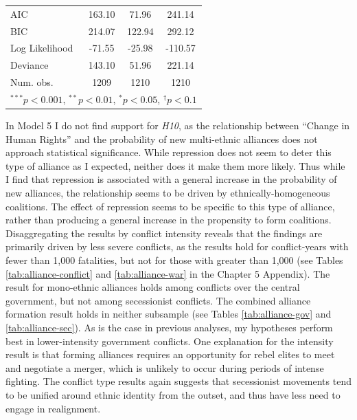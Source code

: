 \documentclass[12pt,]{book}
\let\origtable\table
\let\endorigtable\endtable
\renewenvironment{table}[1][2] {
    \singlespacing
    \expandafter\origtable\expandafter[H]
} {
    \endorigtable
}
\theoremstyle{definition}
\theoremstyle{definition}
\theoremstyle{definition}
\theoremstyle{remark}
\begin{document}
\begin{table}
\begin{center}
\begin{tabular}{l c c c }
AIC                               & 163.10            & 71.96     & 241.14            \\
BIC                               & 214.07            & 122.94    & 292.12            \\
Log Likelihood                    & -71.55            & -25.98    & -110.57           \\
Deviance                          & 143.10            & 51.96     & 221.14            \\
Num. obs.                         & 1209              & 1210      & 1210              \\
\hline
\multicolumn{4}{l}{\scriptsize{$^{***}p<0.001$, $^{**}p<0.01$, $^*p<0.05$, $^{\dagger}p<0.1$}}
\end{tabular}
\caption{Rare Events Logit Models of Alliance Formation}
\label{tab:alliance}
\end{center}
\end{table}

In Model 5 I do not find support for \emph{H10}, as the relationship
between ``Change in Human Rights'' and the probability of new
multi-ethnic alliances does not approach statistical significance. While
repression does not seem to deter this type of alliance as I expected,
neither does it make them more likely. Thus while I find that repression
is associated with a general increase in the probability of new
alliances, the relationship seems to be driven by ethnically-homogeneous
coalitions. The effect of repression seems to be specific to this type
of alliance, rather than producing a general increase in the propensity
to form coalitions. Disaggregating the results by conflict intensity
reveals that the findings are primarily driven by less severe conflicts,
as the results hold for conflict-years with fewer than 1,000 fatalities,
but not for those with greater than 1,000 (see Tables
\ref{tab:alliance-conflict} and \ref{tab:alliance-war} in the Chapter 5
Appendix). The result for mono-ethnic alliances holds among conflicts
over the central government, but not among secessionist conflicts. The
combined alliance formation result holds in neither subsample (see
Tables \ref{tab:alliance-gov} and \ref{tab:alliance-sec}). As is the
case in previous analyses, my hypotheses perform best in lower-intensity
government conflicts. One explanation for the intensity result is that
forming alliances requires an opportunity for rebel elites to meet and
negotiate a merger, which is unlikely to occur during periods of intense
fighting. The conflict type results again suggests that secessionist
movements tend to be unified around ethnic identity from the outset, and
thus have less need to engage in realignment.
\end{document}
